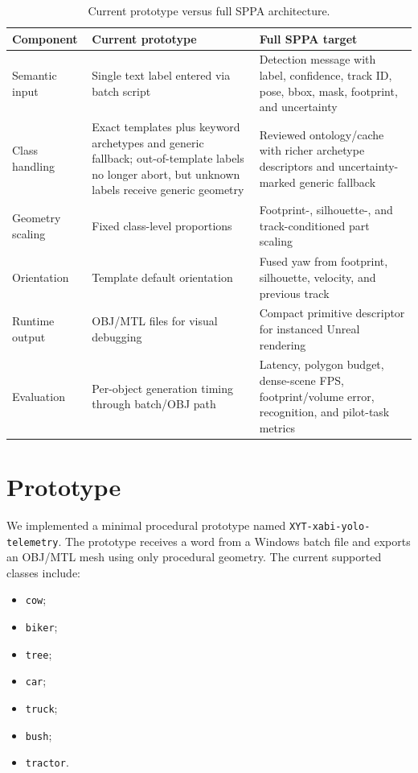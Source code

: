 ﻿\documentclass[11pt,a4paper]{article}
\begin{document}
\begin{table}[h]
\centering
\caption{Current prototype versus full SPPA architecture.}
\label{tab:implementation-status}
\begin{tabular}{@{}p{3.2cm}p{5.1cm}p{5.1cm}@{}}
\toprule
Component & Current prototype & Full SPPA target \\
\midrule
Semantic input & Single text label entered via batch script & Detection message with label, confidence, track ID, pose, bbox, mask, footprint, and uncertainty \\
Class handling & Exact templates plus keyword archetypes and generic fallback; out-of-template labels no longer abort, but unknown labels receive generic geometry & Reviewed ontology/cache with richer archetype descriptors and uncertainty-marked generic fallback \\
Geometry scaling & Fixed class-level proportions & Footprint-, silhouette-, and track-conditioned part scaling \\
Orientation & Template default orientation & Fused yaw from footprint, silhouette, velocity, and previous track \\
Runtime output & OBJ/MTL files for visual debugging & Compact primitive descriptor for instanced Unreal rendering \\
Evaluation & Per-object generation timing through batch/OBJ path & Latency, polygon budget, dense-scene FPS, footprint/volume error, recognition, and pilot-task metrics \\
\bottomrule
\end{tabular}
\end{table}

\section{Prototype}

We implemented a minimal procedural prototype named
\texttt{XYT-xabi-yolo-telemetry}. The prototype receives a word from a Windows
batch file and exports an OBJ/MTL mesh using only procedural geometry. The
current supported classes include:

\begin{itemize}
    \item \texttt{cow};
    \item \texttt{biker};
    \item \texttt{tree};
    \item \texttt{car};
    \item \texttt{truck};
    \item \texttt{bush};
    \item \texttt{tractor}.
\end{itemize}
\end{document}
